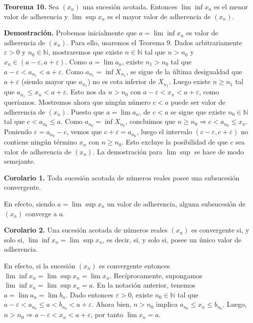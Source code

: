 \documentclass[12pt,oneside]{book}
\begin{document}
\textbf{Teorema 10.} Sea \((x_n)\) una sucesión acotada. Entonces \(\lim \inf x_n\) es el menor valor de adherencia y \(\lim \sup x_n\) es el mayor valor de adherencia de \((x_n)\).

\textbf{Demostración.} Probemos inicialmente que \(a = \lim \inf x_n\) es valor de adherencia de \((x_n)\). Para ello, usaremos el Teorema 9. Dados arbitrariamente \(\varepsilon > 0\) y \(n_0 \in \mathbb{N}\), mostraremos que existe \(n \in \mathbb{N}\) tal que \(n > n_0\) y \(x_n \in (a - \varepsilon, a + \varepsilon)\). Como \(a = \lim a_n\), existe \(n_1 > n_0\) tal que \(a - \varepsilon < a_{n_1} < a + \varepsilon\). Como \(a_{n_1} = \inf X_{n_1}\), se sigue de la última desigualdad que \(a + \varepsilon\) (siendo mayor que \(a_{n_1}\)) no es cota inferior de \(X_{n_1}\). Luego existe \(n \geq n_1\) tal que \( a_{n_1} \leq x_n < a + \varepsilon\). Esto nos da \( n > n_0 \) con \( a - \varepsilon < x_n < a + \varepsilon \), como queríamos. Mostremos ahora que ningún número \( c < a \) puede ser valor de adherencia de \( (x_n) \). Puesto que \( a = \lim a_n \), de \( c < a \) se sigue que existe \( n_0 \in \mathbb{N} \) tal que \( c < a_{n_0} \leq a \). Como \( a_{n_0} = \inf X_{n_0} \), concluimos que \( n \geq n_0 \Rightarrow c < a_{n_0} \leq x_n \). Poniendo \( \varepsilon = a_{n_0} - c \), vemos que \( c + \varepsilon = a_{n_0} \), luego el intervalo \( (c - \varepsilon, c + \varepsilon) \) no contiene ningún término \( x_n \) con \( n \geq n_0 \). Esto excluye la posibilidad de que \( c \) sea valor de adherencia de \( (x_n) \). La demostración para \(\lim \sup\) se hace de modo semejante.

\textbf{Corolario 1.} Toda sucesión acotada de números reales posee una subsucesión convergente.

En efecto, siendo \( a = \lim \sup x_n \) un valor de adherencia, alguna subsucesión de \( (x_n) \) converge a \( a \).

\textbf{Corolario 2.} Una sucesión acotada de números reales \( (x_n) \) es convergente si, y solo si, \( \lim \inf x_n = \lim \sup x_n \), es decir, si, y solo si, posee un único valor de adherencia.

En efecto, si la sucesión \( (x_n) \) es convergente entonces \( \lim \inf x_n = \lim \sup x_n = \lim x_n \). Recíprocamente, supongamos \( \lim \inf x_n = \lim \sup x_n = a \). En la notación anterior, tenemos \( a = \lim a_n = \lim b_n \). Dado entonces \( \varepsilon > 0 \), existe \( n_0 \in \mathbb{N} \) tal que \( a - \varepsilon < a_{n_0} \leq a < b_{n_0} < a + \varepsilon \). Ahora bien, \( n > n_0 \) implica \( a_{n_0} \leq x_n \leq b_{n_0} \). Luego, \( n > n_0 \Rightarrow a - \varepsilon < x_n < a + \varepsilon \), por tanto \( \lim x_n = a \).
\end{document}
